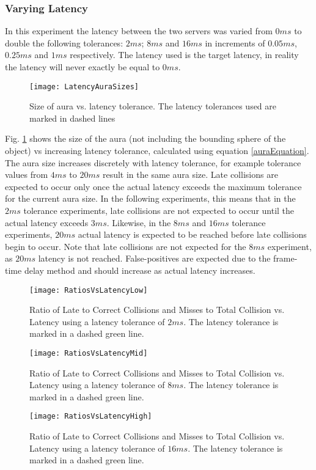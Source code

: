 \subsubsection{Varying Latency}

In this experiment the latency between the two servers was varied from $0ms$ to double the following tolerances: $2ms$; $8ms$ and $16ms$ in increments of $0.05ms$, $0.25ms$ and $1ms$ respectively. The latency used is the target latency, in reality the latency will never exactly be equal to $0ms$.

\begin{figure}
	\centering
	\texttt{[image: LatencyAuraSizes]}
	\caption{Size of aura vs. latency tolerance. The latency tolerances used are marked in dashed lines}
	\label{fig_LatencyAuraSize}
\end{figure}

Fig. \ref{fig_LatencyAuraSize} shows the size of the aura (not including the bounding sphere of the object) vs increasing latency tolerance, calculated using equation \ref{auraEquation}. The aura size increases discretely with latency tolerance, for example tolerance values from $4ms$ to $20ms$ result in the same aura size. Late collisions are expected to occur only once the actual latency exceeds the maximum tolerance for the current aura size. In the following experiments, this means that in the $2ms$ tolerance experiments, late collisions are not expected to occur until the actual latency exceeds $3ms$. Likewise, in the $8ms$ and $16ms$ tolerance experiments, $20ms$ actual latency is expected to be reached before late collisions begin to occur. Note that late collisions are not expected for the $8ms$ experiment, as $20ms$ latency is not reached. False-positives are expected due to the frame-time delay method and should increase as actual latency increases.

\begin{figure}
	\centering
	\texttt{[image: RatiosVsLatencyLow]}
	\caption{Ratio of Late to Correct Collisions and Misses to Total Collision vs. Latency using a latency tolerance of $2ms$. The latency tolerance is marked in a dashed green line.}
	\label{fig_RatioVsLatencyLow}
\end{figure}
\begin{figure}
	\centering
	\texttt{[image: RatiosVsLatencyMid]}
	\caption{Ratio of Late to Correct Collisions and Misses to Total Collision vs. Latency using a latency tolerance of $8ms$. The latency tolerance is marked in a dashed green line.}
	\label{fig_RatioVsLatencyMid}
\end{figure}
\begin{figure}
	\centering
	\texttt{[image: RatiosVsLatencyHigh]}
	\caption{Ratio of Late to Correct Collisions and Misses to Total Collision vs. Latency using a latency tolerance of $16ms$. The latency tolerance is marked in a dashed green line.}
	\label{fig_RatioVsLatencyHigh}
\end{figure}

